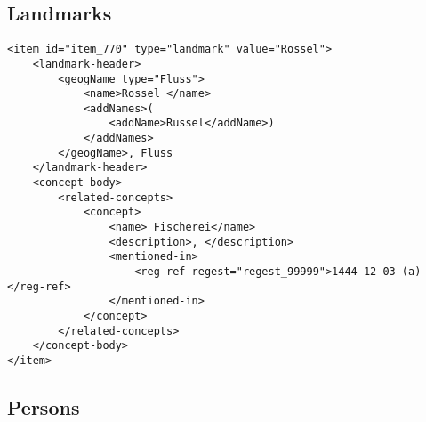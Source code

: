 \subsection{Landmarks}
\label{sec:landmark-examples}

\begin{verbatim}
<item id="item_770" type="landmark" value="Rossel">
    <landmark-header>
        <geogName type="Fluss">
            <name>Rossel </name>
            <addNames>(
                <addName>Russel</addName>)
            </addNames>
        </geogName>, Fluss
    </landmark-header>
    <concept-body>
        <related-concepts>
            <concept>
                <name> Fischerei</name>
                <description>, </description>
                <mentioned-in>
                    <reg-ref regest="regest_99999">1444-12-03 (a)</reg-ref>
                </mentioned-in>
            </concept>
        </related-concepts>
    </concept-body>
</item>
\end{verbatim}

\subsection{Persons}
\label{sec:person-examples}

